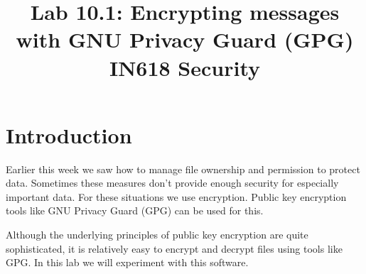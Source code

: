 \documentclass{article}
\begin{document}
\title{ Lab 10.1: Encrypting messages with GNU Privacy Guard (GPG) \\ IN618 Security}
\maketitle

\section*{Introduction}
Earlier this week we saw how to manage file ownership and permission to protect data.  Sometimes these measures don't provide enough security for especially important data.  For these situations we use encryption.  Public key encryption tools like GNU Privacy Guard (GPG) can be used for this.

Although the underlying principles of public key encryption are quite sophisticated, it is relatively easy to encrypt and decrypt files using tools like GPG. In this lab we will experiment with this software.
\end{document}

